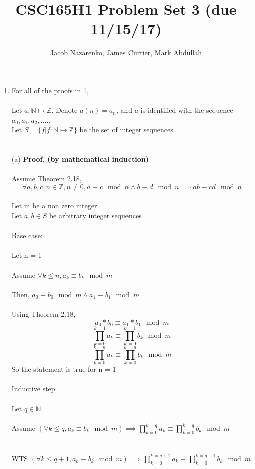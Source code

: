 \documentclass{article}
\title{CSC165H1 Problem Set 3 (due 11/15/17)}
\author{Jacob Nazarenko, James Currier, Mark Abdullah}
\newcommand{\Z}{\mathbb{Z}}
\newcommand{\N}{\mathbb{N}}
\begin{document}
\maketitle
\begin{enumerate}
	\item For all of the proofs in 1,\\\\
	Let $a : \N \mapsto \Z.$ Denote $a(n) = a_n$, and $a$ is identified with the sequence
	$a_0, a_1, a_2,$.....\\ Let $S = \{f|f : \N \mapsto \Z\}$ be the set of integer sequences.
	\\\\\\
	(a)	\textbf{Proof. (by mathematical induction)} \\\\
	Assume Theorem 2.18, $$\forall a,b,c,n \in \Z, n\neq 0, a\equiv c\mod n \wedge b \equiv d \mod n \implies ab\equiv cd \mod n$$\\
	Let m be a non zero integer\\
	Let $a,b\in S$ be arbitrary integer sequences\\\\
	\underline{Base case:}\\\\
	Let n = 1\\\\
	Assume $\forall k \leq n, a_k \equiv b_k \mod m$\\\\
	Then, $a_0 \equiv b_0 \mod m \wedge a_1 \equiv b_1 \mod m$\\\\
	Using Theorem 2.18, 
	$$a_0 * b_0\equiv a_1 * b_1 \mod m$$
	$${\displaystyle \prod_{k = 0}^{k=1} a_k}\equiv {\displaystyle \prod_{k = 0}^{k=1} b_k} \mod m$$
	$${\displaystyle \prod_{k = 0}^{k=n} a_k}\equiv {\displaystyle \prod_{k = 0}^{k=n} b_k} \mod m$$
	So the statement is true for n = 1
	\\\\
	\underline{Inductive step:}\\\\
	Let $q\in \N$\\\\
	Assume $(\forall k \leq q, a_k \equiv b_k \mod m) \implies {\displaystyle \prod_{k = 0}^{k=q} a_k}\equiv {\displaystyle \prod_{k = 0}^{k=q} b_k} \mod m$\\\\\\
	WTS $(\forall k \leq q + 1, a_k \equiv b_k \mod m) \implies {\displaystyle \prod_{k = 0}^{k=q+1} a_k}\equiv {\displaystyle \prod_{k = 0}^{k=q+1} b_k} \mod m$\\\\\\

\end{enumerate}
\end{document}
